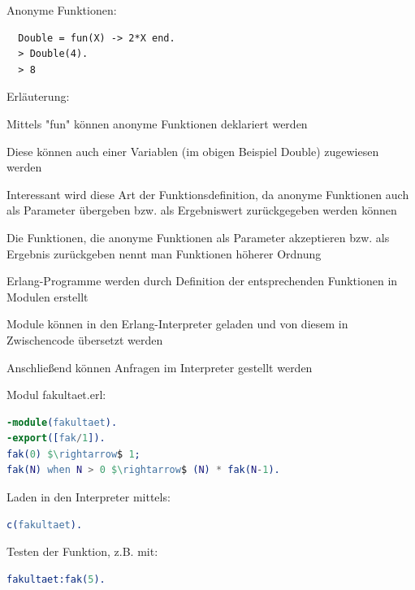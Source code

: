 \documentclass[10pt]{article}
\begin{document}
Anonyme Funktionen:
\begin{lstlisting}
  Double = fun(X) -> 2*X end.
  > Double(4).
  > 8
\end{lstlisting}
\begin{itemize*}
  \item Erläuterung:
  \item Mittels "fun" können anonyme Funktionen deklariert werden
  \item Diese können auch einer Variablen (im obigen Beispiel Double) zugewiesen werden
  \item Interessant wird diese Art der Funktionsdefinition, da anonyme Funktionen auch als Parameter übergeben bzw. als Ergebniswert zurückgegeben werden können
  \item Die Funktionen, die anonyme Funktionen als Parameter akzeptieren bzw. als Ergebnis zurückgeben nennt man Funktionen höherer Ordnung
\end{itemize*}

\begin{itemize*}
  \item Erlang-Programme werden durch Definition der entsprechenden Funktionen in Modulen erstellt
  \item Module können in den Erlang-Interpreter geladen und von diesem in Zwischencode übersetzt werden
  \item Anschließend können Anfragen im Interpreter gestellt werden
\end{itemize*}

Modul fakultaet.erl:
\begin{lstlisting}[language=erlang]
-module(fakultaet).
-export([fak/1]).
fak(0) $\rightarrow$ 1;
fak(N) when N > 0 $\rightarrow$ (N) * fak(N-1).
\end{lstlisting}
Laden in den Interpreter mittels:
\begin{lstlisting}[language=erlang] 
c(fakultaet).
\end{lstlisting}
Testen der Funktion, z.B. mit:
\begin{lstlisting}[language=erlang]
fakultaet:fak(5).
\end{lstlisting}
\end{document}
